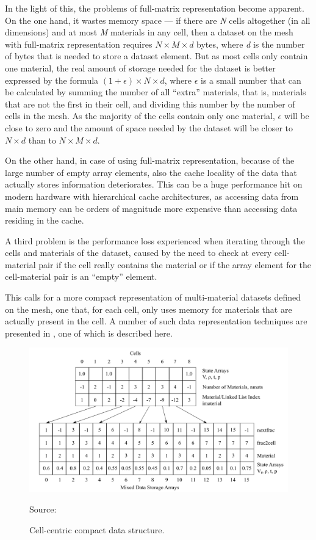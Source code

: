 \documentclass[fontsize=11pt, appendixprefix=true]{scrreprt}
\begin{document}
In the light of this, the problems of full-matrix representation become
apparent. On the one hand, it wastes memory space --- if there are \textit{N}
cells altogether (in all dimensions) and at most \textit{M} materials in any
cell, then a dataset on the mesh with full-matrix representation requires $N
\times M \times d$ bytes, where \textit{d} is the number of bytes that is needed
to store a dataset element. But as most cells only contain one material, the
real amount of storage needed for the dataset is better expressed by the formula
$(1 + \epsilon) \times N \times d$, where $\epsilon$ is a small number that can
be calculated by summing the number of all ``extra'' materials, that is,
materials that are not the first in their cell, and dividing this number by the
number of cells in the mesh. As the majority of the cells contain only one
material, $\epsilon$ will be close to zero and the amount of space needed by the
dataset will be closer to $N \times d$ than to $N \times M \times d$.

On the other hand, in case of using full-matrix representation, because of the
large number of empty array elements, also the cache locality of the data that
actually stores information deteriorates. This can be a huge performance hit on
modern hardware with hierarchical cache architectures, as accessing data from
main memory can be orders of magnitude more expensive than accessing data
residing in the cache.

A third problem is the performance loss experienced when iterating through the
cells and materials of the dataset, caused by the need to check at every
cell-material pair if the cell really contains the material or if the array
element for the cell-material pair is an ``empty'' element.

This calls for a more compact representation of multi-material datasets defined
on the mesh, one that, for each cell, only uses memory for materials that are
actually present in the cell. A number of such data representation techniques
are presented in \cite{osti_1341844}, one of which is described here.

\begin{figure}
    \centering
    \includegraphics[width=\textwidth]{mixed_mat_arrays}
    \caption{Cell-centric compact data structure.}
    \label{fig:mixed_mat_arrays}

    \small Source: \cite{osti_1341844}
\end{figure}
\end{document}
